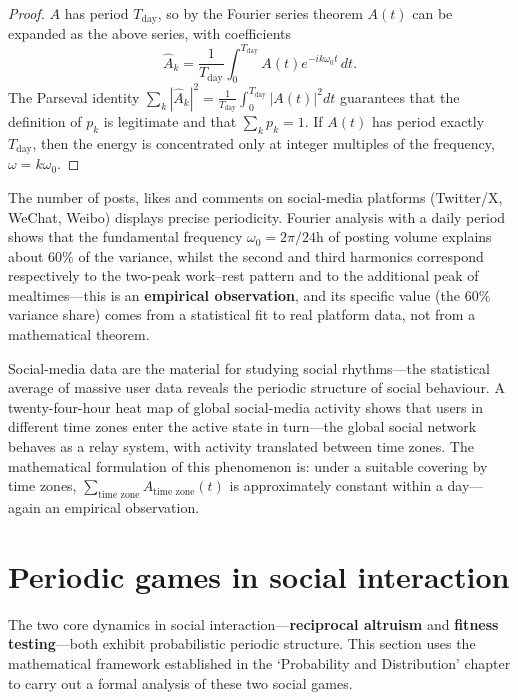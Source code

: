 \begin{proof}
$A$ has period $T_{\text{day}}$, so by the Fourier series theorem $A(t)$ can be expanded as the above series, with coefficients
\[
\hat{A}_k = \frac{1}{T_{\text{day}}}\int_0^{T_{\text{day}}} A(t)e^{-ik\omega_0 t}\,dt.
\]
The Parseval identity $\sum_{k}|\hat{A}_k|^2 = \frac{1}{T_{\text{day}}}\int_0^{T_{\text{day}}}|A(t)|^2 dt$ guarantees that the definition of $p_k$ is legitimate and that $\sum_k p_k = 1$. If $A(t)$ has period exactly $T_{\text{day}}$, then the energy is concentrated only at integer multiples of the frequency, $\omega = k\omega_0$.
\end{proof}

\begin{remark}\label{prop:social_media_rhythm}
The number of posts, likes and comments on social-media platforms (Twitter/X, WeChat, Weibo) displays precise periodicity. Fourier analysis with a daily period shows that the fundamental frequency $\omega_0 = 2\pi/24\text{h}$ of posting volume explains about $60\%$ of the variance, whilst the second and third harmonics correspond respectively to the two-peak work--rest pattern and to the additional peak of mealtimes---this is an \textbf{empirical observation}, and its specific value (the $60\%$ variance share) comes from a statistical fit to real platform data, not from a mathematical theorem.

Social-media data are the material for studying social rhythms---the statistical average of massive user data reveals the periodic structure of social behaviour. A twenty-four-hour heat map of global social-media activity shows that users in different time zones enter the active state in turn---the global social network behaves as a relay system, with activity translated between time zones. The mathematical formulation of this phenomenon is: under a suitable covering by time zones, $\sum_{\text{time zone}} A_{\text{time zone}}(t)$ is approximately constant within a day---again an empirical observation.
\end{remark}

\section{Periodic games in social interaction}

The two core dynamics in social interaction---\textbf{reciprocal altruism} and \textbf{fitness testing}---both exhibit probabilistic periodic structure. This section uses the mathematical framework established in the `Probability and Distribution' chapter to carry out a formal analysis of these two social games.

